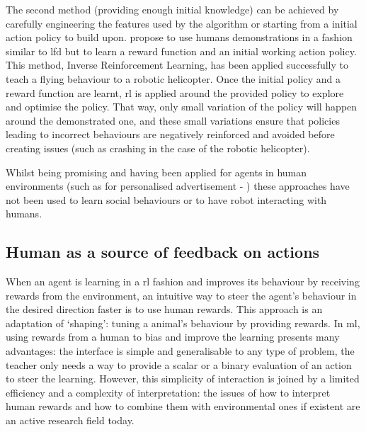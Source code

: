 	The second method (providing enough initial knowledge) can be achieved by carefully engineering the features used by the algorithm or starting from a initial action policy to build upon. \cite{abbeel2004apprenticeship} propose to use humans demonstrations in a fashion similar to \gls{lfd} but to learn a reward function and an initial working action policy. This method, Inverse Reinforcement Learning, has been applied successfully to teach a flying behaviour to a robotic helicopter. Once the initial policy and a reward function are learnt, \gls{rl} is applied around the provided policy to explore and optimise the policy. That way, only small variation of the policy will happen around the demonstrated one, and these small variations ensure that policies leading to incorrect behaviours are negatively reinforced and avoided before creating issues (such as crashing in the case of the robotic helicopter). 
	
	
	Whilst being promising and having been applied for agents in human environments (such as for personalised advertisement - \citealt{theocharous2015personalized})	these approaches have not been used to learn social behaviours or to have robot interacting with humans.

\subsection{Human as a source of feedback on actions}

When an agent is learning in a \gls{rl} fashion and improves its behaviour by receiving rewards from the environment, an intuitive way to steer the agent's behaviour in the desired direction faster is to use human rewards. This approach is an adaptation of `shaping': tuning a animal's behaviour by providing rewards. In \gls{ml}, using rewards from a human to bias and improve the learning presents many advantages: the interface is simple and generalisable to any type of problem, the teacher only needs a way to provide a scalar or a binary evaluation of an action to steer the learning. However, this simplicity of interaction is joined by a limited efficiency and a complexity of interpretation: the issues of how to interpret human rewards and how to combine them with environmental ones if existent are an active research field today.

